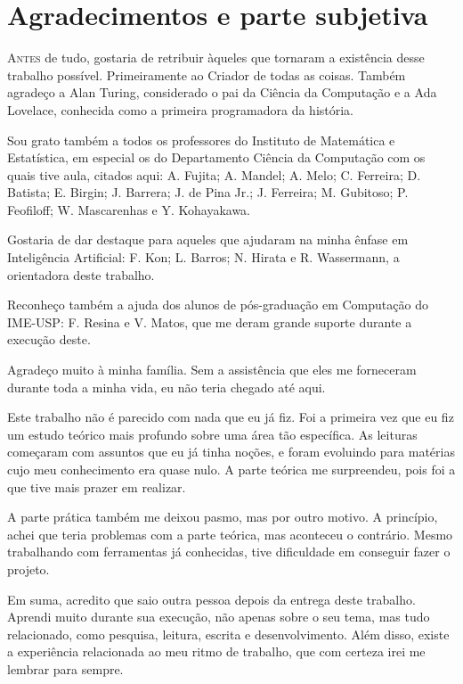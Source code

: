 \chapter*{Agradecimentos e parte subjetiva}

\lettrine{A}{ntes} de tudo, gostaria de retribuir àqueles que tornaram a existência desse trabalho possível. Primeiramente ao Criador de todas as coisas. Também agradeço a Alan Turing, considerado o pai da Ciência da Computação e a Ada Lovelace, conhecida como a primeira programadora da história.

Sou grato também a todos os professores do Instituto de Matemática e Estatística, em especial os do Departamento Ciência da Computação com os quais tive aula, citados aqui: A. Fujita; A. Mandel; A. Melo; C. Ferreira; D. Batista; E. Birgin; J. Barrera; J. de Pina Jr.; J. Ferreira; M. Gubitoso; P. Feofiloff; W. Mascarenhas e Y. Kohayakawa. 

Gostaria de dar destaque para aqueles que ajudaram na minha ênfase em Inteligência Artificial: F. Kon; L. Barros; N. Hirata e R. Wassermann, a orientadora deste trabalho.

Reconheço também a ajuda dos alunos de pós-graduação em Computação do IME-USP: F. Resina e V. Matos, que me deram grande suporte durante a execução deste. 

Agradeço muito à minha família. Sem a assistência que eles me forneceram durante toda a minha vida, eu não teria chegado até aqui.

Este trabalho não é parecido com nada que eu já fiz. Foi a primeira vez que eu fiz um estudo teórico mais profundo sobre uma área tão específica. As leituras começaram com assuntos que eu já tinha noções, e foram evoluindo para matérias cujo meu conhecimento era quase nulo. A parte teórica me surpreendeu, pois foi a que tive mais prazer em realizar.

A parte prática também me deixou pasmo, mas por outro motivo. A princípio, achei que teria problemas com a parte teórica, mas aconteceu o contrário. Mesmo trabalhando com ferramentas já conhecidas, tive dificuldade em conseguir fazer o projeto.

Em suma, acredito que saio outra pessoa depois da entrega deste trabalho. Aprendi muito durante sua execução, não apenas sobre o seu tema, mas tudo relacionado, como pesquisa, leitura, escrita e desenvolvimento. Além disso, existe a experiência relacionada ao meu ritmo de trabalho, que com certeza irei me lembrar para sempre.